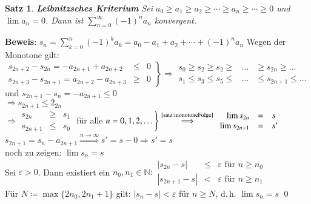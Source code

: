 \documentclass[ngerman,titlepage,twoside, parskip=half*]{scrreprt}
\newcommand*{\N}{\mathbb{N}}
\theoremstyle{plain}
\newtheorem{theorem}{Satz}[section]
\theoremstyle{definition}
\theoremstyle{remark}
\begin{document}
\begin{theorem}
\label{satz:LeibKrit}
\textbf{Leibnitzsches Kriterium} Sei $a_0\geq a_1\geq a_2\geq \cdots \geq a_n\geq \cdots
\geq 0$ und $\lim a_n=0$. Dann ist $\sum_{n=0}^\infty (-1)^na_n$ konvergent.
\end{theorem}
\textbf{Beweis}: $s_n=\sum_{k=0}^n (-1)^ka_k=a_0-a_1+a_2+\cdots +(-1)^na_n$ Wegen der Monotone gilt:\\
$\left.
\begin{array}{rcl}
  s_{2n+2}-s_{2n}=-a_{2n+1}+a_{2n+2} & \leq & 0\\
  s_{2n+3}-s_{2n+1}=a_{2n+2}-a_{2n+3} & \geq & 0
\end{array}
\right\} \Rightarrow
\begin{array}{rcl}
  s_0\geq s_2\geq s_2\geq & \ldots & \geq s_{2n}\geq \ldots\\
  s_1\leq s_3\leq s_5\leq & \ldots & \leq s_{2n+1}\leq \ldots
\end{array}$ und $s_{2n+1}-s_n=-a_{2n+1}\leq 0$\\
$\Rightarrow s_{2n+1}\leq 2_{2n}$\\
$\Rightarrow
\begin{array}{rcl}
  s_{2n} &\geq & s_1\\
  s_{2n+1}&\leq & s_0
\end{array}$
für alle $n=0,1,2,\ldots \Bigg\}\stackrel{\text{\autoref{satz:monotoneFolge}}}{\Longrightarrow}
\begin{array}{rcl}
  \lim s_{2n} & = & s\\
  \lim s_{2n+1} & = & s'
\end{array}$\\
$s_{2n+1}=s_n-a_{2n+1}\stackrel{n\rightarrow\infty}{\Longrightarrow} s'=s-0\Rightarrow s'=s$\\
noch zu zeigen: $\lim s_n=s$\\
Sei $\varepsilon>0$. Dann existiert ein $n_0, n_1 \in \N \colon
\begin{array}{rcl}
  |s_{2n}-s| & \leq & \varepsilon \text{ für } n\geq n_0\\
  |s_{2n+1}-s| &< & \varepsilon \text{ für } n\geq n_1
\end{array}$\\
Für $N\coloneqq\max\{2n_0,2n_1+1\}$ gilt: $|s_n-s|<\varepsilon$ für $n\geq N$, d.\,h. $\lim s_n=s$
\qed
\end{document}
